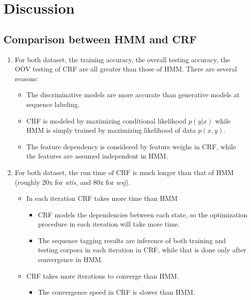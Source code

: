 \documentclass[winfonts,UTF8]{article}
\begin{document}
\section{Discussion}
\subsection{Comparison between HMM and CRF}
\begin{enumerate}
\item For both dataset, the training accuracy, the overall testing accuracy, the OOV testing of CRF are all greater than those of HMM. There are several reasons: \\
\begin{itemize}
\item The discriminative models are more accurate than generative models at sequence labeling.
\item CRF is modeled by maximizing conditional likelihood $p(y|x)$ while HMM is simply trained by maximizing likelihood of data $p(x, y)$.
\item The feature dependency is considered by feature weighs in CRF, while the features are assumed independent in HMM.
\end{itemize}

\item For both dataset, the run time of CRF is much longer than that of HMM (roughly 20x for \emph{atis}, and 80x for \emph{wsj}).
\begin{itemize}
\item In each iteration CRF takes more time than HMM
\begin{itemize}
\item CRF models the dependencies between each state, so the optimization procedure in each iteration will take more time.
\item The sequence tagging results are inference of both training and testing corpora in each iteration in CRF, while that is done only after convergence in HMM.
\end{itemize}
\item CRF takes more iterations to converge than HMM.
\begin{itemize}
\item The convergence speed in CRF is slower than HMM.
\end{itemize}

\end{itemize}

\end{enumerate}
\end{document}
